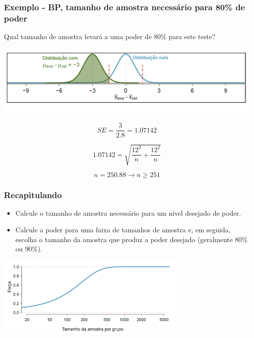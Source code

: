 
\begin{frame}
\frametitle{Exemplo - BP, tamanho de amostra necessário para 80\% de poder}
\justifying
{\dq
{\footnotesize
Qual tamanho de amostra levará a uma poder de 80\% para este teste?
}}

\pause

\includegraphics[width=\textwidth]{5-4_power/power_null_0_0-76_with_alt_at_3_and_shaded.png}

\pause
\small{
\[ SE = \frac{3}{2.8} = 1.07142 \]

\pause

\[ 1.07142 = \sqrt{ \frac{12^2}{n} + \frac{12^2}{n} } \]

\pause

\[ n = 250.88 \rightarrow n \ge 251 \]
}
\end{frame}


\begin{frame}
\frametitle{Recapitulando}

\begin{itemize}
\justifying
\item Calcule o tamanho de amostra necessário para um nível desejado de poder.
\justifying
\item Calcule a poder para uma faixa de tamanhos de amostra e, em seguida, escolha o tamanho da amostra que produz a poder desejado (geralmente 80\% ou 90\%).
\end{itemize}
\begin{center}
\includegraphics[width=0.7\textwidth]{5-4_power/power_curve_neg-3.png}
\end{center}

\end{frame}

